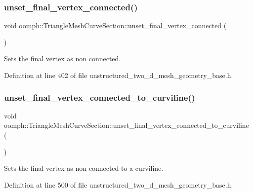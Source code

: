 \subsubsection{\texorpdfstring{unset\+\_\+final\+\_\+vertex\+\_\+connected()}{unset\_final\_vertex\_connected()}}
{\footnotesize\ttfamily void oomph\+::\+Triangle\+Mesh\+Curve\+Section\+::unset\+\_\+final\+\_\+vertex\+\_\+connected (\begin{DoxyParamCaption}{ }\end{DoxyParamCaption})\hspace{0.3cm}{\ttfamily [inline]}}



Sets the final vertex as non connected. 



Definition at line 402 of file unstructured\+\_\+two\+\_\+d\+\_\+mesh\+\_\+geometry\+\_\+base.\+h.

\mbox{\label{classoomph_1_1TriangleMeshCurveSection_a169b20e7458f2ca0a7d64f35e475cecf}} 
\subsubsection{\texorpdfstring{unset\+\_\+final\+\_\+vertex\+\_\+connected\+\_\+to\+\_\+curviline()}{unset\_final\_vertex\_connected\_to\_curviline()}}
{\footnotesize\ttfamily void oomph\+::\+Triangle\+Mesh\+Curve\+Section\+::unset\+\_\+final\+\_\+vertex\+\_\+connected\+\_\+to\+\_\+curviline (\begin{DoxyParamCaption}{ }\end{DoxyParamCaption})\hspace{0.3cm}{\ttfamily [inline]}}



Sets the final vertex as non connected to a curviline. 



Definition at line 500 of file unstructured\+\_\+two\+\_\+d\+\_\+mesh\+\_\+geometry\+\_\+base.\+h.



